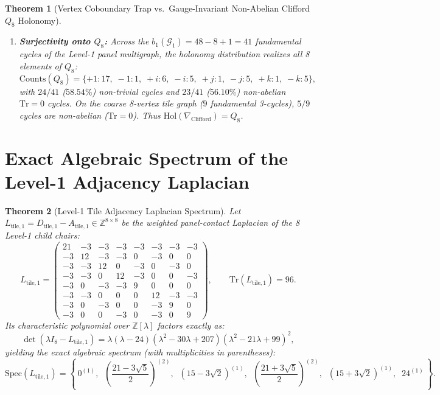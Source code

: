 \documentclass[11pt,a4paper]{article}
\newtheorem{theorem}{Theorem}[section]
\theoremstyle{definition}
\begin{document}
\begin{theorem}[Vertex Coboundary Trap vs.\ Gauge-Invariant Non-Abelian Clifford $Q_8$ Holonomy]
\begin{enumerate}
    \item \textbf{Surjectivity onto $Q_8$:} Across the $b_1(\mathcal{G}_1) = 48 - 8 + 1 = 41$ fundamental cycles of the Level-1 panel multigraph, the holonomy distribution realizes all 8 elements of $Q_8$:
    \begin{equation}
    \text{Counts}(Q_8) = \{+1: 17,\; -1: 1,\; +i: 6,\; -i: 5,\; +j: 1,\; -j: 5,\; +k: 1,\; -k: 5\},
    \end{equation}
    with $24/41$ ($58.54\%$) non-trivial cycles and $23/41$ ($56.10\%$) non-abelian $\mathrm{Tr}=0$ cycles. On the coarse 8-vertex tile graph ($9$ fundamental 3-cycles), $5/9$ cycles are non-abelian ($\mathrm{Tr}=0$). Thus $\mathrm{Hol}(\nabla_{\mathrm{Clifford}}) = Q_8$.
\end{enumerate}
\end{theorem}

\section{Exact Algebraic Spectrum of the Level-1 Adjacency Laplacian}

\begin{theorem}[Level-1 Tile Adjacency Laplacian Spectrum]
Let $L_{\mathrm{tile},1} = D_{\mathrm{tile},1} - A_{\mathrm{tile},1} \in \mathbb{Z}^{8\times 8}$ be the weighted panel-contact Laplacian of the 8 Level-1 child chairs:
\begin{equation}
L_{\mathrm{tile},1} = \begin{pmatrix}
21 & -3 & -3 & -3 & -3 & -3 & -3 & -3 \\
-3 & 12 & -3 & -3 &  0 & -3 &  0 &  0 \\
-3 & -3 & 12 &  0 & -3 &  0 & -3 &  0 \\
-3 & -3 &  0 & 12 & -3 &  0 &  0 & -3 \\
-3 &  0 & -3 & -3 &  9 &  0 &  0 &  0 \\
-3 & -3 &  0 &  0 &  0 & 12 & -3 & -3 \\
-3 &  0 & -3 &  0 &  0 & -3 &  9 &  0 \\
-3 &  0 &  0 & -3 &  0 & -3 &  0 &  9
\end{pmatrix}, \qquad \mathrm{Tr}(L_{\mathrm{tile},1}) = 96.
\end{equation}
Its characteristic polynomial over $\mathbb{Z}[\lambda]$ factors exactly as:
\begin{equation}
\det(\lambda I_8 - L_{\mathrm{tile},1}) = \lambda(\lambda - 24)(\lambda^2 - 30\lambda + 207)(\lambda^2 - 21\lambda + 99)^2,
\end{equation}
yielding the exact algebraic spectrum (with multiplicities in parentheses):
\begin{equation}
\mathrm{Spec}(L_{\mathrm{tile},1}) = \left\{\, 0^{(1)},\;\; \left(\frac{21 - 3\sqrt{5}}{2}\right)^{(2)},\;\; (15 - 3\sqrt{2})^{(1)},\;\; \left(\frac{21 + 3\sqrt{5}}{2}\right)^{(2)},\;\; (15 + 3\sqrt{2})^{(1)},\;\; 24^{(1)} \,\right\}.
\end{equation}
\end{theorem}
\end{document}
